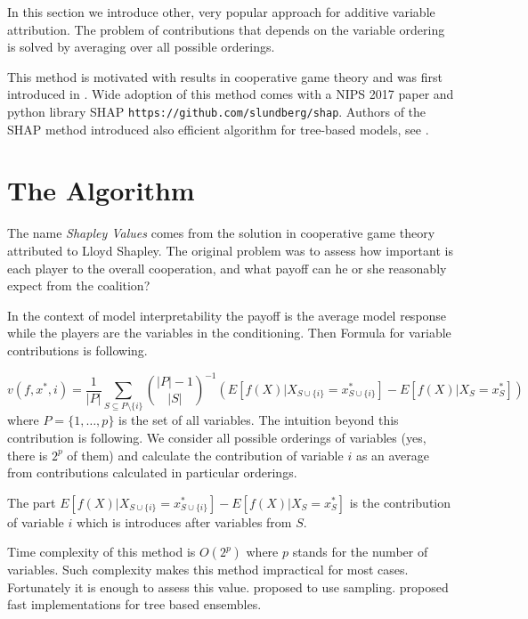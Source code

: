 \documentclass[]{book}
\theoremstyle{definition}
\theoremstyle{definition}
\theoremstyle{definition}
\theoremstyle{remark}
\begin{document}
In this section we introduce other, very popular approach for additive
variable attribution. The problem of contributions that depends on the
variable ordering is solved by averaging over all possible orderings.

This method is motivated with results in cooperative game theory and was
first introduced in \citep{Strumbelj2014}. Wide adoption of this method
comes with a NIPS 2017 paper \citep{SHAP} and python library SHAP
\texttt{https://github.com/slundberg/shap}. Authors of the SHAP method
introduced also efficient algorithm for tree-based models, see
\citep{TreeSHAP}.

\hypertarget{the-algorithm-2}{%
\section{The Algorithm}\label{the-algorithm-2}}

The name \emph{Shapley Values} comes from the solution in cooperative
game theory attributed to Lloyd Shapley. The original problem was to
assess how important is each player to the overall cooperation, and what
payoff can he or she reasonably expect from the coalition?
\citep{shapleybook1952}

In the context of model interpretability the payoff is the average model
response while the players are the variables in the conditioning. Then
Formula for variable contributions is following.

\[
v(f, x^*, i) = \frac 1{|P|}\sum_{S \subseteq P\setminus \{i\}}  {{|P|-1}\choose{|S|}}^{-1} \left(E [f(X) | X_{S \cup \{i\}} = x^*_{S \cup \{i\}}] - E [f(X) | X_{S} = x^*_{S}]\right)
\] where \(P = \{1, \ldots, p\}\) is the set of all variables. The
intuition beyond this contribution is following. We consider all
possible orderings of variables (yes, there is \(2^p\) of them) and
calculate the contribution of variable \(i\) as an average from
contributions calculated in particular orderings.

The part
\(E[f(X) | X_{S \cup \{i\}} = x^*_{S \cup \{i\}}] - E [f(X) | X_{S} = x^*_{S}]\)
is the contribution of variable \(i\) which is introduces after
variables from \(S\).

Time complexity of this method is \(O(2^p)\) where \(p\) stands for the
number of variables. Such complexity makes this method impractical for
most cases. Fortunately it is enough to assess this value.
\citep{Strumbelj2014} proposed to use sampling. \citep{TreeSHAP}
proposed fast implementations for tree based ensembles.
\end{document}

